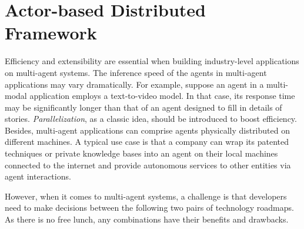 \section{Actor-based Distributed Framework}
\label{sec:distribute}

Efficiency and extensibility are essential when building industry-level applications on multi-agent systems.
The inference speed of the agents in multi-agent applications may vary dramatically. 
For example, suppose an agent in a multi-modal application employs a text-to-video model. In that case, its response time may be significantly longer than that of an agent designed to fill in details of stories.
\emph{Parallelization}, as a classic idea, should be introduced to boost efficiency.
Besides, multi-agent applications can comprise agents physically distributed on different machines.
A typical use case is that a company can wrap its patented techniques or private knowledge bases into an agent on their local machines connected to the internet and provide autonomous services to other entities via agent interactions.

However, when it comes to multi-agent systems, a challenge is that developers need to make decisions between the following two pairs of technology roadmaps.
As there is no free lunch, any combinations have their benefits and drawbacks. 

